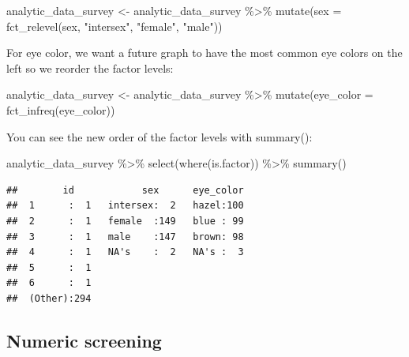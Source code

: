 \documentclass[
]{krantz}
\makeatletter
\newenvironment{Shaded}{\begin{snugshade}}{\end{snugshade}}
\newcommand{\AttributeTok}[1]{\textcolor[rgb]{0.61,0.61,0.61}{#1}}
\newcommand{\FunctionTok}[1]{\textcolor[rgb]{0,0,0}{#1}}
\newcommand{\NormalTok}[1]{#1}
\newcommand{\OtherTok}[1]{\textcolor[rgb]{0.37,0.37,0.37}{#1}}
\newcommand{\SpecialCharTok}[1]{\textcolor[rgb]{0,0,0}{#1}}
\newcommand{\StringTok}[1]{\textcolor[rgb]{0.5,0.5,0.5}{#1}}
\newenvironment{kframe}{%
\medskip{}
\setlength{\fboxsep}{.8em}
 \def\at@end@of@kframe{}%
 \ifinner\ifhmode%
  \def\at@end@of@kframe{\end{minipage}}%
  \begin{minipage}{\columnwidth}%
 \fi\fi%
 \def\FrameCommand##1{\hskip\@totalleftmargin \hskip-\fboxsep
 \colorbox{shadecolor}{##1}\hskip-\fboxsep
     \hskip-\linewidth \hskip-\@totalleftmargin \hskip\columnwidth}%
 \MakeFramed {\advance\hsize-\width
   \@totalleftmargin\z@ \linewidth\hsize
   \@setminipage}}%
 {\par\unskip\endMakeFramed%
 \at@end@of@kframe}
\renewenvironment{Shaded}{\begin{kframe}}{\end{kframe}}
\makeatother
\begin{document}
\begin{Shaded}
\begin{Highlighting}[]
\NormalTok{analytic\_data\_survey }\OtherTok{\textless{}{-}}\NormalTok{ analytic\_data\_survey }\SpecialCharTok{\%\textgreater{}\%}
  \FunctionTok{mutate}\NormalTok{(}\AttributeTok{sex =} \FunctionTok{fct\_relevel}\NormalTok{(sex,}
                           \StringTok{"intersex"}\NormalTok{,}
                           \StringTok{"female"}\NormalTok{,}
                           \StringTok{"male"}\NormalTok{))}
\end{Highlighting}
\end{Shaded}

For eye color, we want a future graph to have the most common eye colors on the left so we reorder the factor levels:

\begin{Shaded}
\begin{Highlighting}[]
\NormalTok{analytic\_data\_survey }\OtherTok{\textless{}{-}}\NormalTok{ analytic\_data\_survey }\SpecialCharTok{\%\textgreater{}\%}
  \FunctionTok{mutate}\NormalTok{(}\AttributeTok{eye\_color =} \FunctionTok{fct\_infreq}\NormalTok{(eye\_color))}
\end{Highlighting}
\end{Shaded}

You can see the new order of the factor levels with summary():

\begin{Shaded}
\begin{Highlighting}[]
\NormalTok{analytic\_data\_survey }\SpecialCharTok{\%\textgreater{}\%}
  \FunctionTok{select}\NormalTok{(}\FunctionTok{where}\NormalTok{(is.factor)) }\SpecialCharTok{\%\textgreater{}\%}
  \FunctionTok{summary}\NormalTok{()}
\end{Highlighting}
\end{Shaded}

\begin{verbatim}
##        id            sex      eye_color  
##  1      :  1   intersex:  2   hazel:100  
##  2      :  1   female  :149   blue : 99  
##  3      :  1   male    :147   brown: 98  
##  4      :  1   NA's    :  2   NA's :  3  
##  5      :  1                             
##  6      :  1                             
##  (Other):294
\end{verbatim}

\hypertarget{numeric-screening-3}{%
\subsection{Numeric screening}\label{numeric-screening-3}}
\end{document}
